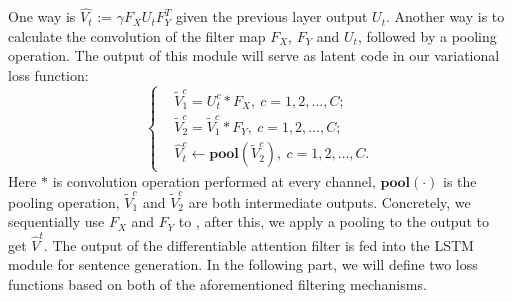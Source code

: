 \documentclass[10pt,twocolumn,letterpaper]{article}
\begin{document}
	One way is $\hat{V_t}$ := $\gamma F_X U_t F_Y^T$ given the previous layer output $U_t$. Another way is to calculate the convolution of the filter map $F_X$, $F_Y$ and $U_t$, followed by a pooling operation. The output of this module will serve as latent code in our variational loss function:
	\begin{equation}
	\left\{
	\begin{aligned}
	&{{\tilde V}_{1}^c} = {U^c_t}*{F_X},~c=1,2,\ldots,C;\\
	&{{\tilde V}_{2}^c} = {{\tilde V}_{1}^c}*{F_Y},~c=1,2,\ldots,C;\\
	&{\hat{V}_{t}^c}\leftarrow \mathbf{pool}({{\tilde V}^c_{2}}),~c=1,2,\ldots,C.
	\end{aligned}
	\right.
	\end{equation}
	Here $*$ is convolution operation performed at every channel, $\mathbf{pool}(\cdot)$ is the pooling operation, ${{\tilde V}_{1}^c}$ and ${{\tilde V}_{2}^c}$ are both intermediate outputs. Concretely, we sequentially use $F_X$ and $F_Y$ to , after this, we apply a pooling to the output to get $\hat{V}^t$.
	The output of the differentiable attention filter is fed into the LSTM module for sentence generation. In the following part, we will define two loss functions based on both of the aforementioned filtering mechanisms.
	
	
	
	
	
	
	
\end{document}
